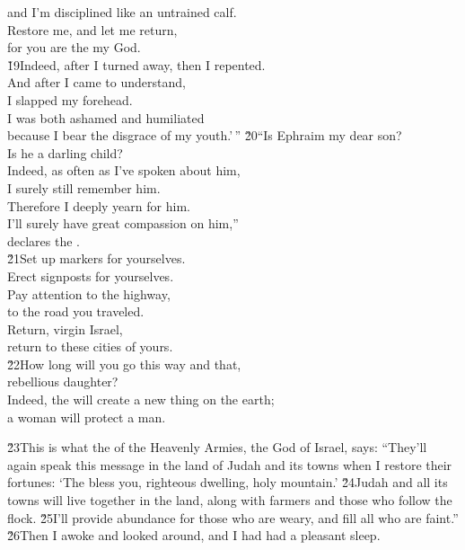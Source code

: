 \begin{poetry}
\poemll    and I'm disciplined like an untrained calf. \\
\poeml Restore me, and let me return, \\
\poemll    for you are the  my God. \\
\poeml \v{19}Indeed, after I turned away, then I repented. \\
\poemll    And after I came to understand, \\
\poemlll       I slapped my forehead. \\
\poeml I was both ashamed and humiliated \\
\poemll    because I bear the disgrace of my youth.'\,''
\poeml \v{20}``Is Ephraim my dear son? \\
\poemll    Is he a darling child? \\
\poeml Indeed, as often as I've spoken about him, \\
\poemll    I surely still remember him. \\
\poeml Therefore I deeply yearn for him. \\
\poemll    I'll surely have great compassion on him,'' \\
\poemlll       declares the . \\
\poeml \v{21}Set up markers for yourselves. \\
\poemll    Erect signposts for yourselves. \\
\poeml Pay attention to the highway, \\
\poemll    to the road you traveled. \\
\poeml Return, virgin Israel, \\
\poemll    return to these cities of yours. \\
\poeml \v{22}How long will you go this way and that, \\
\poemll    rebellious daughter? \\
\poeml Indeed, the  will create a new thing on the earth; \\
\poemll    a woman will protect a man.
\end{poetry}

\v{23}This is what the  of the Heavenly Armies, the God of Israel, says: ``They'll again speak this message in the land of Judah and its towns when I restore their fortunes: `The  bless you, righteous dwelling, holy mountain.' \v{24}Judah and all its towns will live together in the land, along with farmers and those who follow the flock. \v{25}I'll provide abundance for those who are weary, and fill all who are faint.'' \v{26}Then I awoke and looked around, and I had had a pleasant sleep.

